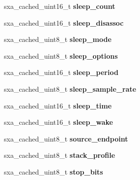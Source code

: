 \begin{DoxyCompactItemize}
sxa\+\_\+cached\+\_\+uint16\+\_\+t {\bfseries sleep\+\_\+count}
\item 
\mbox{\label{structsxa__node__t_ad5afcd7a6f3cbdb16fe69055e7b8846d}} 
sxa\+\_\+cached\+\_\+uint16\+\_\+t {\bfseries sleep\+\_\+disassoc}
\item 
\mbox{\label{structsxa__node__t_a28336f5bad6b465b0369b3acfc62d189}} 
sxa\+\_\+cached\+\_\+uint8\+\_\+t {\bfseries sleep\+\_\+mode}
\item 
\mbox{\label{structsxa__node__t_aed3bebe6a6fae2d721034293d2ab5e6f}} 
sxa\+\_\+cached\+\_\+uint8\+\_\+t {\bfseries sleep\+\_\+options}
\item 
\mbox{\label{structsxa__node__t_ae374c3f0670061420de61693cc9a4b45}} 
sxa\+\_\+cached\+\_\+uint16\+\_\+t {\bfseries sleep\+\_\+period}
\item 
\mbox{\label{structsxa__node__t_a9438233a08e6ad639e8d2ef265afa76c}} 
sxa\+\_\+cached\+\_\+uint8\+\_\+t {\bfseries sleep\+\_\+sample\+\_\+rate}
\item 
\mbox{\label{structsxa__node__t_a1b8b3953786fc8f4e85babd2424714ea}} 
sxa\+\_\+cached\+\_\+uint16\+\_\+t {\bfseries sleep\+\_\+time}
\item 
\mbox{\label{structsxa__node__t_a5c074f146b34af1d0676c4ed20dd8add}} 
sxa\+\_\+cached\+\_\+uint16\+\_\+t {\bfseries sleep\+\_\+wake}
\item 
\mbox{\label{structsxa__node__t_a797bdd82fbff3c15a514b681fb86497d}} 
sxa\+\_\+cached\+\_\+uint8\+\_\+t {\bfseries source\+\_\+endpoint}
\item 
\mbox{\label{structsxa__node__t_ad870c94f6e1cb4697b6d2e04f15e71e7}} 
sxa\+\_\+cached\+\_\+uint8\+\_\+t {\bfseries stack\+\_\+profile}
\item 
\mbox{\label{structsxa__node__t_aee1069d5bd2d37c3be8c5c5d4e17fa02}} 
sxa\+\_\+cached\+\_\+uint8\+\_\+t {\bfseries stop\+\_\+bits}
\item 
\mbox{\label{structsxa__node__t_a3212070d20eab81e78e6ed45c625d9cf}} 

\end{DoxyCompactItemize}
